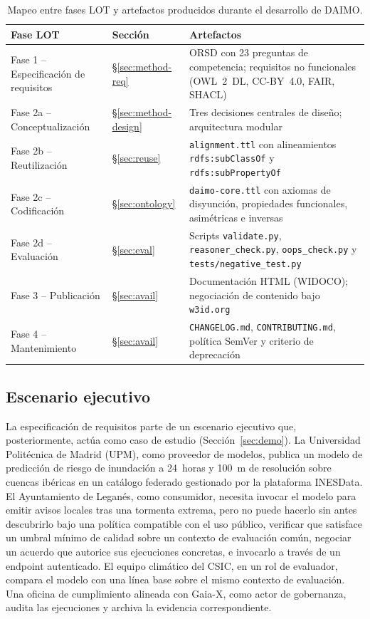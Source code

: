 \documentclass[11pt,a4paper]{article}
\newcommand{\code}[1]{\texttt{#1}}
\begin{document}
\begin{table}[t]
\caption{Mapeo entre fases LOT y artefactos producidos durante el desarrollo de DAIMO.}
\label{tab:lot}
\centering
\small
\begin{tabularx}{\textwidth}{@{}L{4.5cm}L{3cm}X@{}}
\toprule
\textbf{Fase LOT} & \textbf{Sección} & \textbf{Artefactos} \\
\midrule
Fase 1 -- Especificación de requisitos & §\ref{sec:method-req} & ORSD con 23 preguntas de competencia; requisitos no funcionales (OWL~2~DL, CC-BY~4.0, FAIR, SHACL) \\[0.3em]
Fase 2a -- Conceptualización & §\ref{sec:method-design} & Tres decisiones centrales de diseño; arquitectura modular \\[0.3em]
Fase 2b -- Reutilización & §\ref{sec:reuse} & \code{alignment.ttl} con alineamientos \code{rdfs:subClassOf} y \code{rdfs:subPropertyOf} \\[0.3em]
Fase 2c -- Codificación & §\ref{sec:ontology} & \code{daimo-core.ttl} con axiomas de disyunción, propiedades funcionales, asimétricas e inversas \\[0.3em]
Fase 2d -- Evaluación & §\ref{sec:eval} & Scripts \code{validate.py}, \code{reasoner\_check.py}, \code{oops\_check.py} y \code{tests/negative\_test.py} \\[0.3em]
Fase 3 -- Publicación & §\ref{sec:avail} & Documentación HTML (WIDOCO); negociación de contenido bajo \code{w3id.org} \\[0.3em]
Fase 4 -- Mantenimiento & §\ref{sec:avail} & \code{CHANGELOG.md}, \code{CONTRIBUTING.md}, política SemVer y criterio de deprecación \\
\bottomrule
\end{tabularx}
\end{table}

\subsection{Escenario ejecutivo}\label{sec:scenario}

La especificación de requisitos parte de un escenario ejecutivo que, posteriormente, actúa como caso de estudio (Sección~\ref{sec:demo}). La Universidad Politécnica de Madrid (UPM), como proveedor de modelos, publica un modelo de predicción de riesgo de inundación a 24~horas y 100~m de resolución sobre cuencas ibéricas en un catálogo federado gestionado por la plataforma INESData. El Ayuntamiento de Leganés, como consumidor, necesita invocar el modelo para emitir avisos locales tras una tormenta extrema, pero no puede hacerlo sin antes descubrirlo bajo una política compatible con el uso público, verificar que satisface un umbral mínimo de calidad sobre un contexto de evaluación común, negociar un acuerdo que autorice sus ejecuciones concretas, e invocarlo a través de un endpoint autenticado. El equipo climático del CSIC, en un rol de evaluador, compara el modelo con una línea base sobre el mismo contexto de evaluación. Una oficina de cumplimiento alineada con Gaia-X, como actor de gobernanza, audita las ejecuciones y archiva la evidencia correspondiente.
\end{document}
